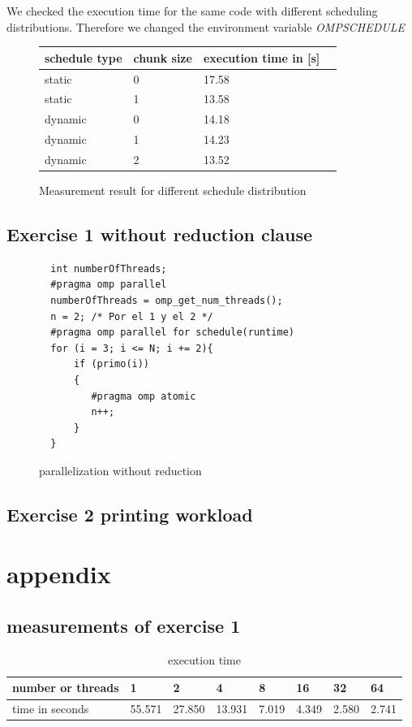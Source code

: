 \documentclass[11pt,a4paper]{article}
\begin{document}
We checked the execution time for the same code with different scheduling distributions. Therefore we changed the environment variable \textit{OMP\textunderscore SCHEDULE}

\begin{figure}[h]
\centering
\label{table_scheduledistribution}
\begin{tabular}{| l | l | l | l |}
    \hline
    schedule type & chunk size & execution time in [s]\\ 
    \hline
	static & 0 & 17.58 \\
	\hline
	static & 1 & 13.58 \\
    \hline
	dynamic & 0 & 14.18 \\
    \hline
    dynamic & 1 & 14.23 \\
    \hline
    dynamic & 2 & 13.52 \\
    \hline
\end{tabular}
\caption{Measurement result for different schedule distribution}
\end{figure}

\subsection{Exercise 1 without reduction clause}
\label{ex21}

\begin{figure}[h]
\label{code_withoutreduction}
\begin{lstlisting}
  int numberOfThreads;
  #pragma omp parallel
  numberOfThreads = omp_get_num_threads();
  n = 2; /* Por el 1 y el 2 */
  #pragma omp parallel for schedule(runtime)
  for (i = 3; i <= N; i += 2){
      if (primo(i))
      {
         #pragma omp atomic
         n++;
      }
  }
\end{lstlisting} 
\caption{parallelization without reduction}
\end{figure}


\subsection{Exercise 2 printing workload}
\label{ex22}

\pagebreak

\section{appendix}

\subsection{measurements of exercise 1}
\begin{table}[h]
\centering

\label{measuresEx1}
\begin{tabular}{@{}l||l|l|l|l|l|l|l|@{}}
number or threads & 1      & 2      & 4      & 8     & 16    & 32    & 64    \\
\hline	
time in seconds   & 55.571 & 27.850 & 13.931 & 7.019 & 4.349 & 2.580 & 2.741
\end{tabular}
\caption{execution time}
\end{table}
\end{document}
